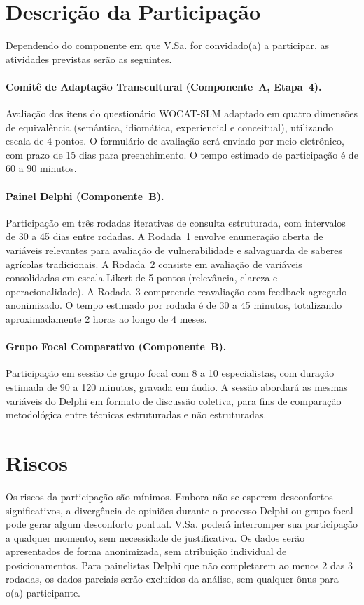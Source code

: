 \documentclass[12pt,a4paper,brazil]{article}
\begin{document}
\section*{Descrição da Participação}

Dependendo do componente em que V.Sa. for convidado(a) a participar, as atividades previstas serão as seguintes.

\paragraph{Comitê de Adaptação Transcultural (Componente~A, Etapa~4).} Avaliação dos itens do questionário WOCAT-SLM adaptado em quatro dimensões de equivalência (semântica, idiomática, experiencial e conceitual), utilizando escala de 4 pontos. O formulário de avaliação será enviado por meio eletrônico, com prazo de 15 dias para preenchimento. O tempo estimado de participação é de 60 a 90 minutos.

\paragraph{Painel Delphi (Componente~B).} Participação em três rodadas iterativas de consulta estruturada, com intervalos de 30 a 45 dias entre rodadas. A Rodada~1 envolve enumeração aberta de variáveis relevantes para avaliação de vulnerabilidade e salvaguarda de saberes agrícolas tradicionais. A Rodada~2 consiste em avaliação de variáveis consolidadas em escala Likert de 5 pontos (relevância, clareza e operacionalidade). A Rodada~3 compreende reavaliação com feedback agregado anonimizado. O tempo estimado por rodada é de 30 a 45 minutos, totalizando aproximadamente 2 horas ao longo de 4 meses.

\paragraph{Grupo Focal Comparativo (Componente~B).} Participação em sessão de grupo focal com 8 a 10 especialistas, com duração estimada de 90 a 120 minutos, gravada em áudio. A sessão abordará as mesmas variáveis do Delphi em formato de discussão coletiva, para fins de comparação metodológica entre técnicas estruturadas e não estruturadas.

\section*{Riscos}

Os riscos da participação são mínimos. Embora não se esperem desconfortos significativos, a divergência de opiniões durante o processo Delphi ou grupo focal pode gerar algum desconforto pontual. V.Sa. poderá interromper sua participação a qualquer momento, sem necessidade de justificativa. Os dados serão apresentados de forma anonimizada, sem atribuição individual de posicionamentos. Para painelistas Delphi que não completarem ao menos 2 das 3 rodadas, os dados parciais serão excluídos da análise, sem qualquer ônus para o(a) participante.
\end{document}
